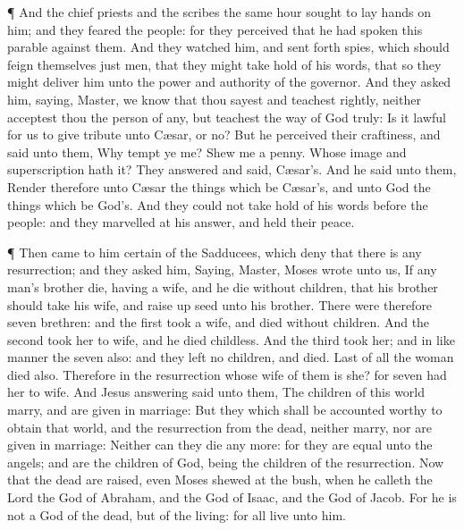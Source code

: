  ¶ And the chief priests and the scribes the same hour
sought to lay hands on him; and they feared the people: for they
perceived that he had spoken this parable against them. 
And they watched him, and sent forth spies, which should feign
themselves just men, that they might take hold of his words, that so
they might deliver him unto the power and authority of the governor.
 And they asked him, saying, Master, we know that thou
sayest and teachest rightly, neither acceptest thou the person of any,
but teachest the way of God truly:  Is it lawful for us to
give tribute unto Cæsar, or no?  But he perceived their
craftiness, and said unto them, Why tempt ye me?  Shew me a
penny. Whose image and superscription hath it? They answered and said,
Cæsar's.  And he said unto them, Render therefore unto
Cæsar the things which be Cæsar's, and unto God the things which be
God's.  And they could not take hold of his words before
the people: and they marvelled at his answer, and held their peace.

 ¶ Then came to him certain of the Sadducees, which deny
that there is any resurrection; and they asked him, 
Saying, Master, Moses wrote unto us, If any man's brother die, having a
wife, and he die without children, that his brother should take his
wife, and raise up seed unto his brother.  There were
therefore seven brethren: and the first took a wife, and died without
children.  And the second took her to wife, and he died
childless.  And the third took her; and in like manner the
seven also: and they left no children, and died.  Last of
all the woman died also.  Therefore in the resurrection
whose wife of them is she? for seven had her to wife.  And
Jesus answering said unto them, The children of this world marry, and
are given in marriage:  But they which shall be accounted
worthy to obtain that world, and the resurrection from the dead, neither
marry, nor are given in marriage:  Neither can they die any
more: for they are equal unto the angels; and are the children of God,
being the children of the resurrection.  Now that the dead
are raised, even Moses shewed at the bush, when he calleth the Lord the
God of Abraham, and the God of Isaac, and the God of Jacob.
 For he is not a God of the dead, but of the living: for
all live unto him.

